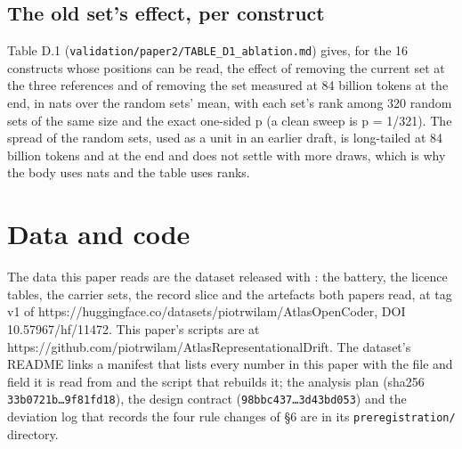\documentclass{article}
\begin{document}
\subsection{The old set's effect, per construct}

Table D.1 (\texttt{validation/paper2/TABLE\_D1\_ablation.md}) gives, for the 16 constructs whose positions can be read, the effect of removing the current set at the three references and of removing the set measured at 84 billion tokens at the end, in nats over the random sets' mean, with each set's rank among 320 random sets of the same size and the exact one-sided p (a clean sweep is p = 1/321). The spread of the random sets, used as a unit in an earlier draft, is long-tailed at 84 billion tokens and at the end and does not settle with more draws, which is why the body uses nats and the table uses ranks.


\section{Data and code}

The data this paper reads are the dataset released with \citet{wilam2026}: the battery, the licence tables, the carrier sets, the record slice and the artefacts both papers read, at tag v1 of https://huggingface.co/datasets/piotrwilam/AtlasOpenCoder, DOI 10.57967/hf/11472. This paper's scripts are at https://github.com/piotrwilam/AtlasRepresentationalDrift. The dataset's README links a manifest that lists every number in this paper with the file and field it is read from and the script that rebuilds it; the analysis plan (sha256 \texttt{33b0721b\ldots{}9f81fd18}), the design contract (\texttt{98bbc437\ldots{}3d43bd053}) and the deviation log that records the four rule changes of \S6 are in its \texttt{preregistration/} directory.
\end{document}
